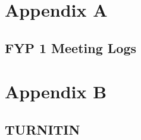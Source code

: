 \chapter{Appendix A}

\centering
\section{FYP 1 Meeting Logs}







\chapter{Appendix B}

\centering
\section{TURNITIN}
 

